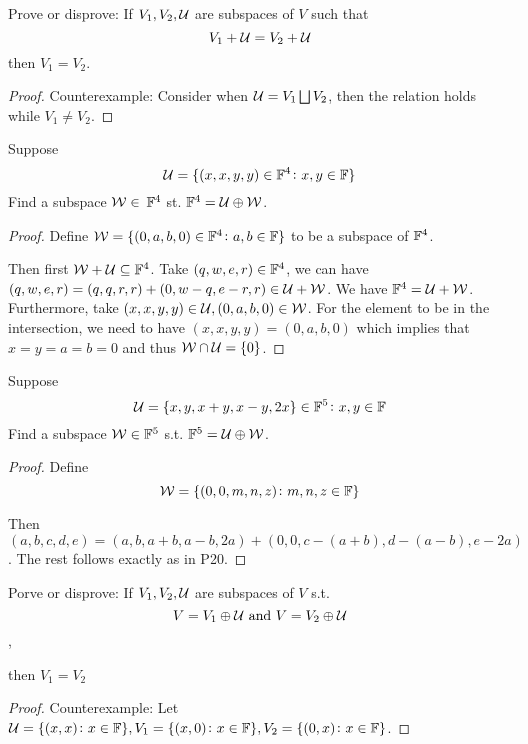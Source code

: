 \documentclass{extarticle}
\begin{document}
\begin{problem}{19}
    Prove or disprove: If \(V_1, V_2, \mathcal{U}\) are subspaces of \(V\) such that 
    \[V_1 + \mathcal{U} = V_2 + \mathcal{U}\]
    then \(V_1 = V_2\).
\end{problem}

\begin{proof}
Counterexample: Consider when \(\mathcal{U} = V_1 \bigsqcup V_2\), then the relation holds 
while \(V_1 \neq V_2\).
\end{proof}

\begin{problem}{20}
    Suppose 
    \[\mathcal{U} = \{(x,x,y,y) \in \mathbb{F}^4 \colon x, y \in \mathbb{F}\}\]
    Find a subspace \(\mathcal{W} \in\) \(\mathbb{F}^4\) st. \(\mathbb{F}^4  =\mathcal{U} \oplus \mathcal{W}\).
\end{problem}

\begin{proof}
Define \(\mathcal{W} = \{(0, a, b, 0) \in \mathbb{F}^4 \colon a,b \in \mathbb{F}\}\) to be a subspace 
of \(\mathbb{F}^4\).

Then first \(\mathcal{W} + \mathcal{U} \subseteq \mathbb{F}^4\). Take \((q,w,e,r) \in \mathbb{F}^4\), we 
can have \((q,w,e,r) = (q,q,r,r) + (0,w-q,e-r,r) \in \mathcal{U} + \mathcal{W}\). We have 
\(\mathbb{F}^4 = \mathcal{U} + \mathcal{W}\). Furthermore, take \((x,x,y,y) \in \mathcal{U}, (0,a,b,0) \in 
\mathcal{W}\). For the element to be in the intersection, we need to have 
\((x,x,y,y)=(0,a,b,0)\) which implies that \(x=y=a=b=0\) and thus \(\mathcal{W} 
\cap \mathcal{U} = \{0\}\). 
\end{proof}

\begin{problem}{21}
    Suppose 
    \[\mathcal{U} = \{x, y, x+y, x-y, 2x\} \in \mathbb{F}^5 \colon x,y \in \mathbb{F}\]
    Find a subspace \(\mathcal{W} \in \mathbb{F}^5\) s.t. \(\mathbb{F}^5 = \mathcal{U} \oplus \mathcal{W}\). 
\end{problem}

\begin{proof}
Define 
\[\mathcal{W} = \{(0,0,m,n,z) \colon m,n,z \in \mathbb{F}\}\]

Then \((a,b,c,d,e) = (a, b, a+b, a-b, 2a) + (0,0, c-(a+b), d-(a - b), e-2a)\). The 
rest follows exactly as in P20.
\end{proof}

\begin{problem}{23}
    Porve or disprove: If \(V_1, V_2, \mathcal{U}\) are subspaces of \(V\) s.t. 
    \[V = V_1 \oplus \mathcal{U} \text{ and } V = V_2 \oplus \mathcal{U}\], 

    then \(V_1 = V_2\)
\end{problem}

\begin{proof}
Counterexample: Let \(\mathcal{U} = \{(x,x) \colon x \in \mathbb{F}\}, V_1 = \{(x,0)\colon x \in \mathbb{F}\},
V_2 = \{(0, x) \colon x \in \mathbb{F}\}\). 
\end{proof}
\end{document}
